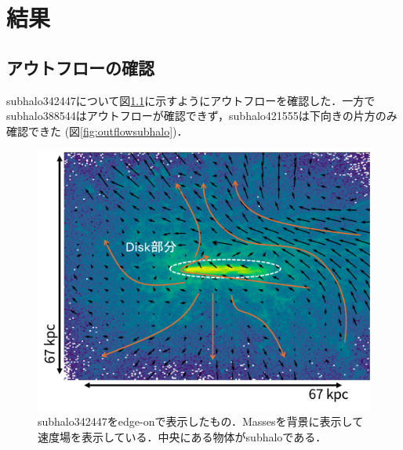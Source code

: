 \documentclass[main.tex]{subfiles}
\begin{document}
	\chapter{結果}
	
	\section{アウトフローの確認}
	subhalo342447について図\ref{fig:outflowsubhalo342447}に示すようにアウトフローを確認した．一方でsubhalo388544はアウトフローが確認できず，subhalo421555は下向きの片方のみ確認できた (図\ref{fig:outflowsubhalo})．
	
	
	\begin{figure}[htbp]
		\centering
		\includegraphics[width=0.6\linewidth]{pic/outflow_subhalo342447}
		\captionsetup{width=.8\linewidth}
		\caption{subhalo342447をedge-onで表示したもの．Massesを背景に表示して速度場を表示している．中央にある物体がsubhaloである．}
		\label{fig:outflowsubhalo342447}
	\end{figure}
	
\end{document}
